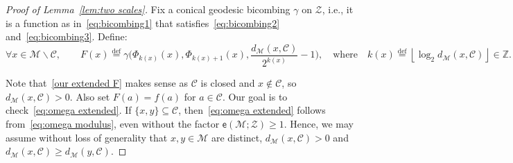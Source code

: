 \documentclass[11pt,reqno]{amsart}
\newcommand{\Z}{\mathbb{Z}}
\renewcommand{\ge}{\geqslant}
\renewcommand{\setminus}{\smallsetminus}
\renewcommand{\subset}{\subseteq}
\newcommand{\ee}{\mathsf{e}}
\newcommand{\eqdef}{\stackrel{\mathrm{def}}{=}}
\newcommand{\cZ}{\mathcal{Z}}
\newcommand{\MM}{\mathcal{M}}
\newcommand{\sub}{\mathscr{C}}
\begin{document}
\begin{proof}[Proof of Lemma~\ref{lem:two scales}]
Fix a conical geodesic bicombing $\gamma$ on $\cZ$, i.e., it is a function as in~\eqref{eq:bicombing1} that satisfies~\eqref{eq:bicombing2} and~\eqref{eq:bicombing3}. Define:
\begin{equation}\label{our extended F}
\forall x\in \MM\setminus \sub,\qquad F(x)\eqdef \gamma\Big(\Phi_{k(x)}(x),\Phi_{k(x) +1}(x),\frac{d_\MM(x,\sub)}{2^{k(x)}}-1\Big),\quad\mathrm{where} \quad  k(x)\eqdef \left\lfloor \log_2 d_\MM(x,\sub)\right\rfloor\in \Z.
\end{equation}

 Note that~\eqref{our extended F} makes sense as $\sub$ is closed and $x\notin \sub$, so $d_\MM(x,\sub)>0$.  Also set $F(a)=f(a)$ for  $a\in \sub$. Our goal is  to  check~\eqref{eq:omega extended}. If $\{x,y\}\subset \sub$, then~\eqref{eq:omega extended} follows from~\eqref{eq:omega modulus}, even without  the factor $\ee(\MM;\cZ)\ge 1$.  Hence, we may assume without loss of generality that $x,y\in \MM$ are distinct, $d_\MM(x,\sub)>0$ and $d_\MM(x,\sub)\ge d_\MM(y,\sub)$.  



\end{proof}
\end{document}
